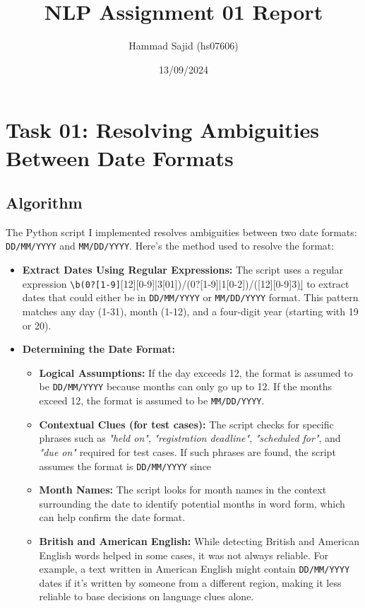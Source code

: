 \documentclass[a4paper,12pt]{article}
\begin{document}
\title{\textbf{NLP Assignment 01 Report}}
\author{Hammad Sajid (hs07606)}
\date{13/09/2024}

\maketitle

\tableofcontents
\newpage

\section{Task 01: Resolving Ambiguities Between Date Formats}

\subsection{Algorithm}

The Python script I implemented resolves ambiguities between two date formats: \texttt{DD/MM/YYYY} and \texttt{MM/DD/YYYY}. Here's the method used to resolve the format:

\begin{itemize}
    \item \textbf{Extract Dates Using Regular Expressions:} The script uses a regular expression \verb|\b(0?[1-9]|[12][0-9]|3[01])/(0?[1-9]|1[0-2])/([12][0-9]{3})\b| to extract dates that could either be in \texttt{DD/MM/YYYY} or \texttt{MM/DD/YYYY} format. This pattern matches any day (1-31), month (1-12), and a four-digit year (starting with 19 or 20).
    
    \item \textbf{Determining the Date Format:}
    \begin{itemize}
        \item \textbf{Logical Assumptions:} If the day exceeds 12, the format is assumed to be \texttt{DD/MM/YYYY} because months can only go up to 12. If the months exceed 12, the format is assumed to be \texttt{MM/DD/YYYY}.
        
        \item \textbf{Contextual Clues (for test cases):} The script checks for specific phrases such as \emph{"held on"}, \emph{"registration deadline"}, \emph{"scheduled for"}, and \emph{"due on"} required for test cases. If such phrases are found, the script assumes the format is \texttt{DD/MM/YYYY} since  
        
        \item \textbf{Month Names:} The script looks for month names in the context surrounding the date to identify potential months in word form, which can help confirm the date format. 
        
        \item \textbf{British and American English:} While detecting British and American English words helped in some cases, it was not always reliable. For example, a text written in American English might contain \texttt{DD/MM/YYYY} dates if it’s written by someone from a different region, making it less reliable to base decisions on language clues alone.
    \end{itemize}
\end{itemize}
\end{document}
